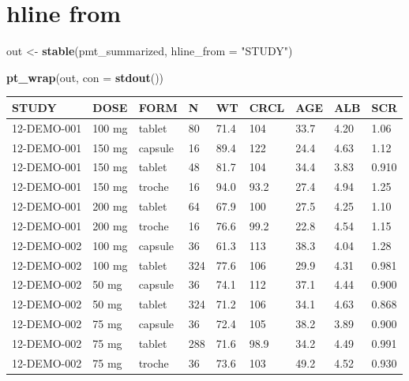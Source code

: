 \documentclass[
]{article}
\newenvironment{Shaded}{\begin{snugshade}}{\end{snugshade}}
\newcommand{\DataTypeTok}[1]{\textcolor[rgb]{0.13,0.29,0.53}{#1}}
\newcommand{\KeywordTok}[1]{\textcolor[rgb]{0.13,0.29,0.53}{\textbf{#1}}}
\newcommand{\NormalTok}[1]{#1}
\newcommand{\StringTok}[1]{\textcolor[rgb]{0.31,0.60,0.02}{#1}}
\begin{document}
\hypertarget{hline-from}{%
\section{hline from}\label{hline-from}}

\begin{Shaded}
\begin{Highlighting}[]
\NormalTok{out <-}\StringTok{ }\KeywordTok{stable}\NormalTok{(pmt_summarized, }\DataTypeTok{hline_from =} \StringTok{"STUDY"}\NormalTok{)}

\KeywordTok{pt_wrap}\NormalTok{(out, }\DataTypeTok{con =} \KeywordTok{stdout}\NormalTok{()) }
\end{Highlighting}
\end{Shaded}

\begin{table}[h]
\centering
{\def\arraystretch{1.4}\tabcolsep=5pt
\begin{threeparttable}
\begin{tabular}[h]{lllllllll}
\hline
STUDY & DOSE & FORM & N & WT & CRCL & AGE & ALB & SCR \\
\hline
12-DEMO-001 & 100 mg & tablet & 80 & 71.4 & 104 & 33.7 & 4.20 & 1.06 \\
12-DEMO-001 & 150 mg & capsule & 16 & 89.4 & 122 & 24.4 & 4.63 & 1.12 \\
12-DEMO-001 & 150 mg & tablet & 48 & 81.7 & 104 & 34.4 & 3.83 & 0.910 \\
12-DEMO-001 & 150 mg & troche & 16 & 94.0 & 93.2 & 27.4 & 4.94 & 1.25 \\
12-DEMO-001 & 200 mg & tablet & 64 & 67.9 & 100 & 27.5 & 4.25 & 1.10 \\
12-DEMO-001 & 200 mg & troche & 16 & 76.6 & 99.2 & 22.8 & 4.54 & 1.15 \\ \hline
12-DEMO-002 & 100 mg & capsule & 36 & 61.3 & 113 & 38.3 & 4.04 & 1.28 \\
12-DEMO-002 & 100 mg & tablet & 324 & 77.6 & 106 & 29.9 & 4.31 & 0.981 \\
12-DEMO-002 & 50 mg & capsule & 36 & 74.1 & 112 & 37.1 & 4.44 & 0.900 \\
12-DEMO-002 & 50 mg & tablet & 324 & 71.2 & 106 & 34.1 & 4.63 & 0.868 \\
12-DEMO-002 & 75 mg & capsule & 36 & 72.4 & 105 & 38.2 & 3.89 & 0.900 \\
12-DEMO-002 & 75 mg & tablet & 288 & 71.6 & 98.9 & 34.2 & 4.49 & 0.991 \\
12-DEMO-002 & 75 mg & troche & 36 & 73.6 & 103 & 49.2 & 4.52 & 0.930 \\
\hline
\end{tabular}
\end{threeparttable}
}
\end{table}
\end{document}
